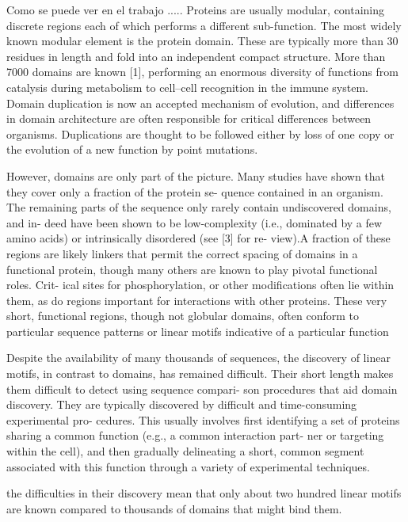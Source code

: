 Como se puede ver en el trabajo \cite{neduva2005linear}.....
Proteins are usually modular, containing discrete regions each of which performs a different sub-function. 
The most widely known modular element is the protein domain. These are typically more than 30 residues in length and fold into an independent compact structure. 
More than 7000 domains are known [1], performing an enormous diversity of functions from catalysis during metabolism to cell–cell recognition in the
immune system. Domain duplication is now an accepted mechanism of evolution, and differences in domain architecture are often responsible for critical differences between organisms.
Duplications are thought to be followed either by loss of one copy or the evolution of a new function by point mutations.


However, domains are only part of the picture. Many studies
have shown that they cover only a fraction of the protein se-
quence contained in an organism. The remaining parts of the
sequence only rarely contain undiscovered domains, and in-
deed have been shown to be low-complexity (i.e., dominated
by a few amino acids) or intrinsically disordered (see [3] for re-
view).A fraction of these regions are likely linkers that permit
the correct spacing of domains in a functional protein, though
many others are known to play pivotal functional roles. Crit-
ical sites for phosphorylation, or other modifications often
lie within them, as do regions important for interactions with
other proteins. These very short, functional regions, though
not globular domains, often conform to particular sequence
patterns or linear motifs indicative of a particular function


Despite the availability of
many thousands of sequences, the discovery of linear motifs,
in contrast to domains, has remained difficult. Their short
length makes them difficult to detect using sequence compari-
son procedures that aid domain discovery. They are typically
discovered by difficult and time-consuming experimental pro-
cedures. This usually involves first identifying a set of proteins
sharing a common function (e.g., a common interaction part-
ner or targeting within the cell), and then gradually delineating
a short, common segment associated with this function
through a variety of experimental techniques.

the difficulties in their discovery
mean that only about two hundred %
linear motifs are known
compared to thousands of domains that might bind them.





